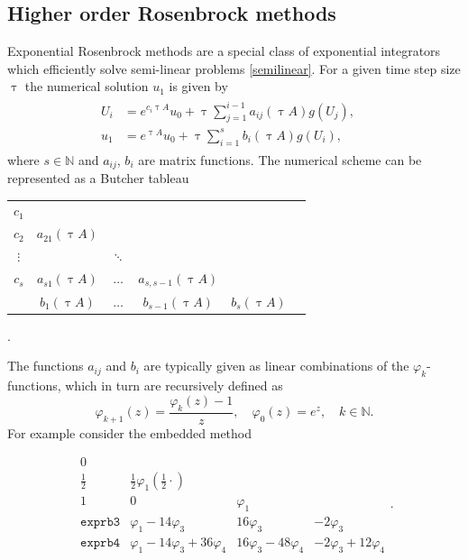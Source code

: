 \documentclass{scrartcl}
\begin{document}
	\subsection{Higher order Rosenbrock methods}
	Exponential Rosenbrock methods are a special class of exponential integrators which efficiently solve semi-linear problems \eqref{semilinear}. For a given time step size $\uptau$ the numerical solution $u_1$ is given by
	\begin{align}
	\begin{split}
	U_{i} &= e^{c_i \uptau A}u_0 + \uptau\sum_{j=1}^{i-1}a_{ij}(\uptau A)g(U_{j}), \quad \\
	u_{1} &= e^{    \uptau A}u_0 + \uptau\sum_{i=1}^{s}b_i(\uptau A)g(U_{i}),
	\end{split}\label{exprbscheme}
	\end{align}
	where $s\in\mathbb{N}$ and $a_{ij}$, $b_{i}$ are matrix functions. The numerical scheme can be represented as a Butcher tableau
	\begin{table}[H]
		\centering
		\begin{tabular}{c|ccccc}
			$c_1$ &  &  &  & \\
			$c_2$ & $a_{21}(\uptau A)$ &  &  & \\
			$\vdots$ & &  $\ddots$  &  & \\
			$c_s$ & $a_{s1}(\uptau A)$ & $\ldots$ & $a_{s,s-1}(\uptau A)$  & \\
			\hline
			&$b_1(\uptau A)$ & $\ldots$ & $b_{s-1}(\uptau A)$ & $b_s(\uptau A)$
		\end{tabular}
		.
	\end{table} \noindent The functions $a_{ij}$ and $b_{i}$ are typically given as linear combinations of the $\varphi_k$-functions, which in turn are recursively defined as 
	\[\varphi_{k+1}(z) = \frac{\varphi_k(z)-1}z, \quad \varphi_0(z) = e^z, \quad k\in\mathbb{N}.\]
	For example consider the embedded method
	\begin{table}[H]
		\centering
		\[
		\renewcommand\arraystretch{1.2}
		\begin{array}
		{c|ccc}
		0\\
		\frac{1}{2} & \frac{1}{2}\varphi_1(\frac{1}{2}\cdot)\\
		1& 0& \varphi_1\\
		\hline
		\texttt{exprb3} & \varphi_1 - 14\varphi_3 & 16\varphi_3 & -2\varphi_3  \\
		\texttt{exprb4} & \varphi_1 - 14\varphi_3 + 36\varphi_4 & 16\varphi_3 -48\varphi_4 & -2\varphi_3 + 12\varphi_4  
		\end{array}.
		\]
	\end{table}
\end{document}

